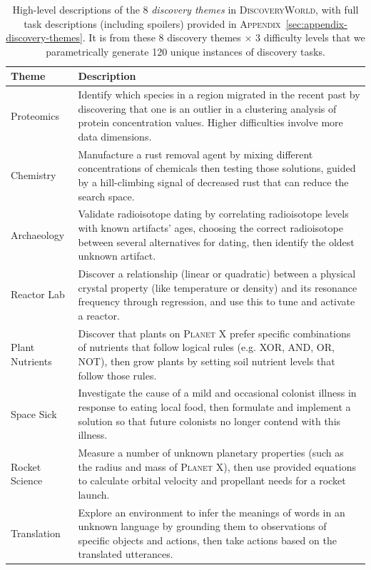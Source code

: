 \documentclass{article}
\newcommand{\env}{\textsc{DiscoveryWorld}\xspace}
\newcommand{\planetX}{\textsc{Planet X}\xspace}
\begin{document}
\begin{table}[t]
\centering
\scriptsize
\caption{\footnotesize High-level descriptions of the 8 \textit{discovery themes} in \env, with full task descriptions (including spoilers) provided in \textsc{Appendix}~\ref{sec:appendix-discovery-themes}. It is from these 8 discovery themes $\times$ 3 difficulty levels that we parametrically generate 120 unique instances of discovery tasks.} 
\label{tab:discovery-task-descriptions}
\begin{tabular}{p{2cm}p{10cm}}
\toprule
\textbf{Theme} & \textbf{Description} \\
\midrule
\rowcolor[HTML]{F3F3F3} 
Proteomics & Identify which species in a region migrated in the recent past by discovering that one is an outlier in a clustering analysis of protein concentration values.  Higher difficulties involve more data dimensions. \\
\midrule
Chemistry & Manufacture a rust removal agent by mixing different concentrations of chemicals then testing those solutions, guided by a hill-climbing signal of decreased rust that can reduce the search space. \\
\midrule 
\rowcolor[HTML]{F3F3F3} 
Archaeology & Validate radioisotope dating by correlating radioisotope levels with known artifacts' ages, choosing the correct radioisotope between several alternatives for dating, then identify the oldest unknown artifact. \\
\midrule
Reactor Lab & Discover a relationship (linear or quadratic) between a physical crystal property (like temperature or density) and its resonance frequency through regression, and use this to tune and activate a reactor. \\
\midrule
\rowcolor[HTML]{F3F3F3} 
Plant Nutrients & Discover that plants on \planetX prefer specific combinations of nutrients that follow logical rules (e.g. \textsc{XOR, AND, OR, NOT}), then grow plants by setting soil nutrient levels that follow those rules. \\
\midrule
Space Sick & Investigate the cause of a mild and occasional colonist illness in response to eating local food, then formulate and implement a solution so that future colonists no longer contend with this illness. \\
\midrule
\rowcolor[HTML]{F3F3F3} 
Rocket Science & Measure a number of unknown planetary properties (such as the radius and mass of \planetX), then use provided equations to calculate orbital velocity and propellant needs for a rocket launch. \\
\midrule
Translation & Explore an environment to infer the meanings of words in an unknown language by grounding them to observations of specific objects and actions, then take actions based on the translated utterances. \\
\bottomrule
\end{tabular}
\end{table}
\end{document}
